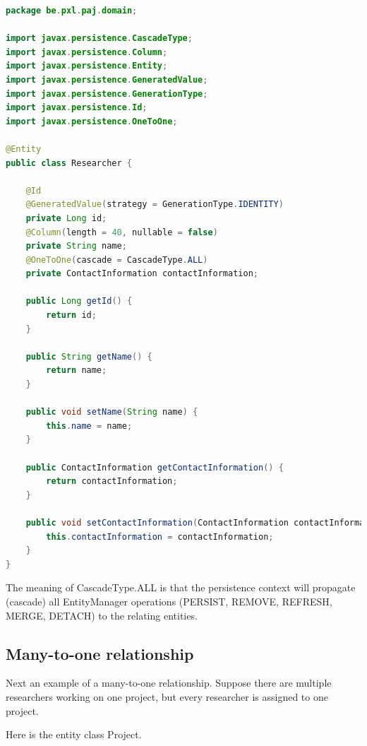 \begin{lstlisting}[frame=single, language=java]
package be.pxl.paj.domain;

import javax.persistence.CascadeType;
import javax.persistence.Column;
import javax.persistence.Entity;
import javax.persistence.GeneratedValue;
import javax.persistence.GenerationType;
import javax.persistence.Id;
import javax.persistence.OneToOne;

@Entity
public class Researcher {

	@Id
	@GeneratedValue(strategy = GenerationType.IDENTITY)
	private Long id;
	@Column(length = 40, nullable = false)
	private String name;
	@OneToOne(cascade = CascadeType.ALL)
	private ContactInformation contactInformation;

	public Long getId() {
		return id;
	}

	public String getName() {
		return name;
	}

	public void setName(String name) {
		this.name = name;
	}

	public ContactInformation getContactInformation() {
		return contactInformation;
	}

	public void setContactInformation(ContactInformation contactInformation) {
		this.contactInformation = contactInformation;
	}
}
\end{lstlisting}

The meaning of CascadeType.ALL is that the persistence context will propagate (cascade) all EntityManager operations (PERSIST, REMOVE, REFRESH, MERGE, DETACH) to the relating entities.

\subsection{Many-to-one relationship}

Next an example of a many-to-one relationship.  
Suppose there are multiple researchers working on one project, but every researcher is assigned to one project. 

Here is the entity class Project.

